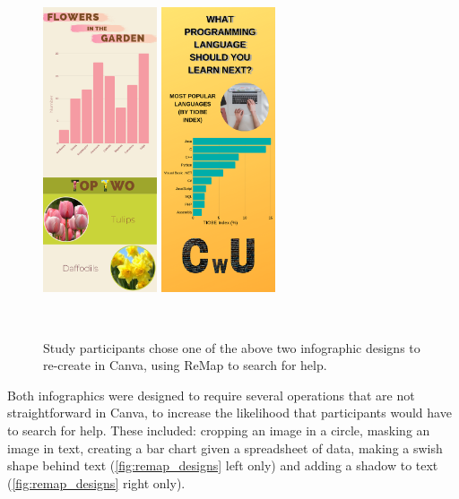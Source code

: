 \begin{figure}[t!]
\centering
  \includegraphics[width=0.3\textwidth]{remap/figures/designA.png}
  \hspace{0.2in}
  \includegraphics[width=0.3\textwidth]{remap/figures/designB.png}
  \caption{Study participants chose one of the above two infographic designs to re-create in Canva, using ReMap to search for help.}~\label{fig:remap_designs}
\end{figure}

Both infographics were designed to require several operations that are not straightforward in Canva, to increase the likelihood that participants would have to search for help. These included: cropping an image in a circle, masking an image in text, creating a bar chart given a spreadsheet of data, making a swish shape behind text (\autoref{fig:remap_designs} left only) and adding a shadow to text (\autoref{fig:remap_designs} right only).

